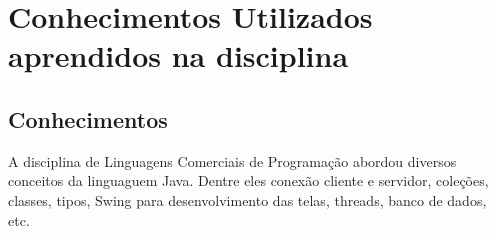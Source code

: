 \chapter{Conhecimentos Utilizados aprendidos na disciplina}\label{ch-aula}

\section{Conhecimentos}

A disciplina de Linguagens Comerciais de Programação abordou diversos conceitos da linguaguem Java. Dentre eles conexão cliente e servidor, coleções, classes, tipos, Swing para desenvolvimento das telas, threads, banco de dados, etc.